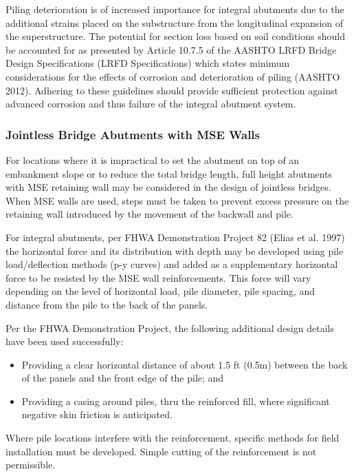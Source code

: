 Piling deterioration is of increased importance for integral abutments due to the additional strains placed on the
substructure from the longitudinal expansion of the superstructure. The potential for section loss based on soil
conditions should be accounted for as presented by Article 10.7.5 of the AASHTO LRFD Bridge Design Specifications
(LRFD Specifications) which states minimum considerations for the effects of corrosion and deterioration of piling
(AASHTO 2012). Adhering to these guidelines should provide sufficient protection against advanced corrosion and
thus failure of the integral abutment system.

\subsubsection{Jointless Bridge Abutments with MSE Walls}
For locations where it is impractical to set the abutment on top of an embankment slope or to reduce the total
bridge length, full height abutments with MSE retaining wall may be considered in the design of jointless bridges. When MSE walls are used, steps must be taken to prevent excess pressure on the retaining wall introduced by the
movement of the backwall and pile.

For integral abutments, per FHWA Demonstration Project 82 (Elias et al. 1997) the horizontal force and its
distribution with depth may be developed using pile load/deflection methods (p-y curves) and added as a
supplementary horizontal force to be resisted by the MSE wall reinforcements. This force will vary depending on the
level of horizontal load, pile diameter, pile spacing, and distance from the pile to the back of the panels.

Per the FHWA Demonstration Project, the following additional design details have been used successfully:

\begin{itemize}
  \item Providing a clear horizontal distance of about 1.5 ft (0.5m) between the back of the panels and the front edge of the pile; and
  \item Providing a casing around piles, thru the reinforced fill, where significant negative skin friction is anticipated.
\end{itemize}

Where pile locations interfere with the reinforcement, specific methods for field installation must be developed.
Simple cutting of the reinforcement is not permissible.

